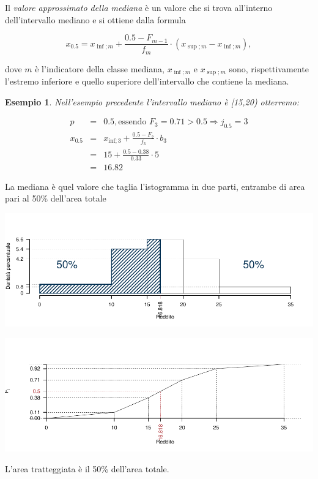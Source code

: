 \documentclass[
  11pt,
]{book}
\theoremstyle{mytheoremstyle}
\theoremstyle{mydefstyle}
\newtheorem{example}{{Esempio}}[section]
\newenvironment{nota}
  {
\begin{tcolorbox}[enhanced,breakable,arc=0.1mm,boxrule=1pt,colback=white,colframe=iblue,title=\bf \fontfamily{lmss}\selectfont \faInfoCircle \hspace{.5 cm} Nota,drop fuzzy shadow]
}{
\end{tcolorbox}
  }
\begin{document}
Il \emph{valore approssimato della mediana} è un valore che si trova all'interno dell'intervallo mediano e si ottiene dalla formula

\begin{info}
\[x_{0.5}=x_{\inf;m}+\frac{0.5-F_{m-1}}{f_m}\cdot \left(x_{\sup;m}-x_{\inf;m} \right),\]

\end{info}

dove \(m\) è l'indicatore della classe mediana, \(x_{\inf;m}\) e \(x_{\sup;m}\) sono, rispettivamente l'estremo inferiore e quello superiore dell'intervallo che contiene la mediana.

\begin{example}
Nell'esempio precedente l'intervallo mediano è {[}15,20) otterremo:

\begin{eqnarray*}
  p &=&  0.5 , \text{essendo }F_{ 3 }= 0.71  > 0.5  \Rightarrow j_{ 0.5 }= 3 \\
  x_{ 0.5 } &=& x_{\text{inf}; 3 } + \frac{ { 0.5 } - F_{ 2 }} {f_{ 3 }} \cdot b_{ 3 } \\
            &=&  15  + \frac {{ 0.5 } -  0.38 } { 0.33 } \cdot  5  \\
            &=&  16.82 
\end{eqnarray*}
\end{example}

\begin{nota}
La mediana è quel valore che taglia l'istogramma in due parti, entrambe di area pari al 50\% dell'area totale

\begin{center}\includegraphics{Appunti_di_Statistica_2025_files/figure-latex/04-mediana-percentili-1-1} \end{center}

\begin{center}\includegraphics{Appunti_di_Statistica_2025_files/figure-latex/04-mediana-percentili-1-2} \end{center}

L'area tratteggiata è il 50\% dell'area totale.

\end{nota}
\end{document}
